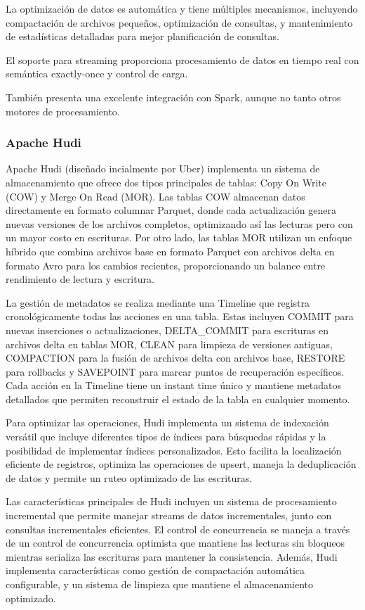 La optimización de datos es automática y tiene múltiples mecanismos, 
incluyendo compactación de archivos pequeños, optimización de consultas, y mantenimiento de estadísticas detalladas 
para mejor planificación de consultas. 

El soporte para streaming proporciona procesamiento de datos en tiempo real con semántica exactly-once y control de carga.

También presenta una excelente integración con Spark, aunque no tanto otros motores de procesamiento.

\subsubsection{Apache Hudi}

Apache Hudi (diseñado incialmente por Uber) implementa un sistema de almacenamiento que ofrece dos tipos principales de tablas: 
Copy On Write (COW) y Merge On Read (MOR). 
Las tablas COW almacenan datos directamente en formato columnar Parquet, donde cada actualización genera nuevas versiones de los archivos completos, 
optimizando así las lecturas pero con un mayor costo en escrituras.
Por otro lado, las tablas MOR utilizan un enfoque híbrido que combina archivos base en formato Parquet con archivos delta en formato Avro 
para los cambios recientes, proporcionando un balance entre rendimiento de lectura y escritura.

La gestión de metadatos se realiza mediante una Timeline que registra cronológicamente todas las acciones en una tabla. 
Estas incluyen COMMIT para nuevas inserciones o actualizaciones, {DELTA\_COMMIT} para escrituras en archivos delta en tablas MOR, 
CLEAN para limpieza de versiones antiguas, COMPACTION para la fusión de archivos delta con archivos base, RESTORE para rollbacks 
y SAVEPOINT para marcar puntos de recuperación específicos. 
Cada acción en la Timeline tiene un instant time único y mantiene metadatos detallados que permiten reconstruir el estado de la tabla 
en cualquier momento.

Para optimizar las operaciones, Hudi implementa un sistema de indexación versátil que incluye diferentes tipos de índices 
para búsquedas rápidas y la posibilidad de implementar índices personalizados. 
Esto facilita la localización eficiente de registros, optimiza las operaciones de upsert, 
maneja la deduplicación de datos y permite un ruteo optimizado de las escrituras.

Las características principales de Hudi incluyen un sistema de procesamiento incremental que permite manejar streams de datos incrementales, 
junto con consultas incrementales eficientes. 
El control de concurrencia se maneja a través de un control de concurrencia optimista que mantiene las lecturas sin bloqueos mientras 
serializa las escrituras para mantener la consistencia. 
Además, Hudi implementa características como gestión de compactación automática configurable, 
y un sistema de limpieza que mantiene el almacenamiento optimizado.

